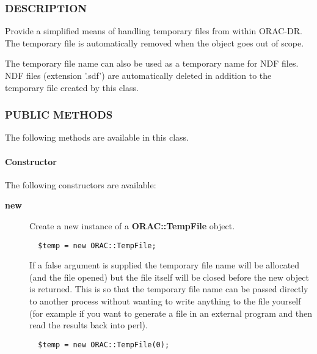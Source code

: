 \begin{description}
\begin{description}
\subsubsection*{DESCRIPTION\label{ORAC::TempFile_DESCRIPTION}}


Provide a simplified means of handling temporary files from within
ORAC-DR. The temporary file is automatically removed when the
object goes out of scope.



The temporary file name can also be used as a temporary name for
NDF files. NDF files (extension '.sdf') are automatically deleted
in addition to the temporary file created by this class.

\subsubsection*{PUBLIC METHODS\label{ORAC::TempFile_PUBLIC_METHODS}}


The following methods are available in this class.

\paragraph*{Constructor\label{ORAC::TempFile_Constructor}}


The following constructors are available:

\begin{description}

\item[{\textbf{new}}] \mbox{}

Create a new instance of a \textbf{ORAC::TempFile} object.

\begin{verbatim}
  $temp = new ORAC::TempFile;
\end{verbatim}


If a false argument is supplied the temporary file
name will be allocated (and the file opened) but the
file itself will be closed before the new object is returned.
This is so that the temporary file name can be passed directly
to another process without wanting to write anything to the
file yourself (for example if you want to generate a file
in an external program and then read the results back into
perl).

\begin{verbatim}
  $temp = new ORAC::TempFile(0);
\end{verbatim}



\end{description}
\end{description}
\end{description}
